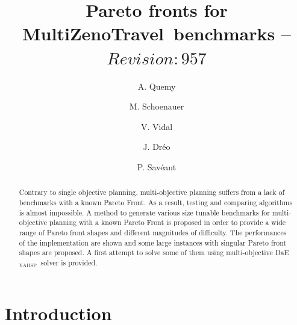 \documentclass{llncs}
\newcommand{\DAEYAHSP}{{\sc DaE$_{\text{YAHSP}}$}}
\def\MULTIZENO{{\sc MultiZenoTravel}}
\begin{document}

\title{Pareto fronts for \MULTIZENO\ benchmarks -- $Revision: 957 $}

\author{A. Quemy  \and M. Schoenauer\and
V. Vidal  \and J. Dr\'eo \and 
P. Sav\'eant}
%
%
%

\maketitle

\begin{abstract}
Contrary to single objective planning, multi-objective planning suffers from a lack of benchmarks with a known Pareto Front. As a result, testing and comparing algorithms is almost impossible. A method to generate various size tunable benchmarks for multi-objective planning with a known Pareto Front is proposed in order to provide a wide range of Pareto front shapes and different magnitudes of difficulty. The performances of the implementation are shown and some large instances with singular Pareto front shapes are proposed. A first attempt to solve some of them using multi-objective \DAEYAHSP\ solver is provided.
\end{abstract}
%
\section{Introduction}
\label{sec:intro}
\end{document}
